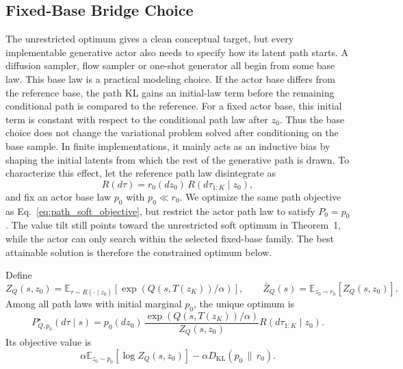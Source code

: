 \documentclass[11pt]{article}
\begin{document}
\subsection{Fixed-Base Bridge Choice}

The unrestricted optimum gives a clean conceptual target, but every implementable generative actor also needs to specify how its latent path starts. A diffusion sampler, flow sampler or one-shot generator all begin from some base law. This base law is a practical modeling choice. If the actor base differs from the reference base, the path KL gains an initial-law term before the remaining conditional path is compared to the reference. For a fixed actor base, this initial term is constant with respect to the conditional path law after $z_0$. Thus the base choice does not change the variational problem solved after conditioning on the base sample. In finite implementations, it mainly acts as an inductive bias by shaping the initial latents from which the rest of the generative path is drawn. To characterize this effect, let the reference path law disintegrate as
\begin{equation}
  R(d\tau)
  =
  r_0(dz_0)\,
  R(d\tau_{1:K}\mid z_0),
\end{equation}
and fix an actor base law $p_0$ with $p_0\ll r_0$. We optimize the same path objective as Eq.~\eqref{eq:path_soft_objective}, but restrict the actor path law to satisfy $P_0=p_0$. The value tilt still points toward the unrestricted soft optimum in Theorem~1, while the actor can only search within the selected fixed-base family. The best attainable solution is therefore the constrained optimum below.

\begin{theorem}
\label{thm:fixed_base_optimum}
Define
\begin{equation}
  Z_Q(s,z_0)
  =
  \mathbb E_{\tau\sim R(\cdot\mid z_0)}
  \left[
    \exp
    \left(
      Q(s,T(z_K))/\alpha
    \right)
  \right],
  \qquad
  \bar Z_Q(s)
  =
  \mathbb E_{z_0\sim r_0}
  \left[
    Z_Q(s,z_0)
  \right].
\end{equation}
Among all path laws with initial marginal $p_0$, the unique optimum is
\begin{equation}
  P_{Q,p_0}^\star(d\tau\mid s)
  =
  p_0(dz_0)\,
  \frac{
    \exp
    \left(
      Q(s,T(z_K))/\alpha
    \right)
  }{
    Z_Q(s,z_0)
  }
  R(d\tau_{1:K}\mid z_0).
  \label{eq:shared_base_optimum}
\end{equation}
Its objective value is
\begin{equation}
  \alpha
  \mathbb E_{z_0\sim p_0}
  \left[
    \log Z_Q(s,z_0)
  \right]
  -
  \alpha
  D_{\mathrm{KL}}
  \left(
    p_0
    \,\|\,
    r_0
  \right).
  \label{eq:fixed_base_objective}
\end{equation}
\end{theorem}
\end{document}
